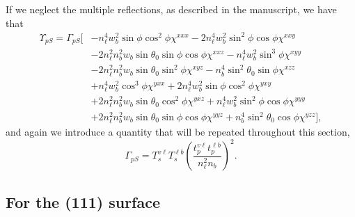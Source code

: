 If we neglect the multiple reflections, as described in the manuscript, we have
that
\begin{equation}\label{eqapp:rpsfull}
\begin{split}
\Upsilon_{pS}
= 
\Gamma_{pS}
\big[
&- n^{4}_{\ell}w^{2}_{b}\sin\phi\cos^{2}\phi\chi^{xxx}
 - 2n^{4}_{\ell}w^{2}_{b}\sin^{2}\phi\cos\phi\chi^{xxy}\\
&- 2n^{2}_{\ell}n^{2}_{b}w_{b}\sin\theta_{0}\sin\phi\cos\phi\chi^{xxz}
 - n^{4}_{\ell}w^{2}_{b}\sin^{3}\phi\chi^{xyy}\\
&- 2n^{2}_{\ell}n^{2}_{b}w_{b}\sin\theta_{0}\sin^{2}\phi\chi^{xyz}
 - n^{4}_{b}\sin^{2}\theta_{0}\sin\phi\chi^{xzz}\\
&+ n^{4}_{\ell}w^{2}_{b}\cos^{3}\phi\chi^{yxx}
 + 2n^{4}_{\ell}w^{2}_{b}\sin\phi\cos^{2}\phi\chi^{yxy}\\
&+ 2n^{2}_{\ell}n^{2}_{b}w_{b}\sin\theta_{0}\cos^{2}\phi\chi^{yxz}
 + n^{4}_{\ell}w^{2}_{b}\sin^{2}\phi\cos\phi\chi^{yyy}\\
&+ 2n^{2}_{\ell}n^{2}_{b}w_{b}\sin\theta_{0}\sin\phi\cos\phi\chi^{yyz}
 + n^{4}_{b}\sin^{2}\theta_{0}\cos\phi\chi^{yzz}
\big],
\end{split}
\end{equation}
and again we introduce a quantity that will be repeated throughout this section,
\begin{equation}\label{eqapp:gammaps}
\Gamma_{pS} =
T^{v\ell}_{s}T^{\ell b}_{s}\left(\frac{t^{v\ell}_{p}t^{\ell b}_{p}}
      {n^{2}_{\ell}n_{b}}\right)^{2}.
\end{equation}


\subsection{For the (111) surface}

